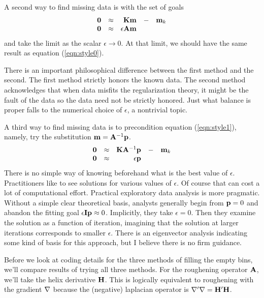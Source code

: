 \par
A second way to find missing data is with the set of goals
\begin{equation}
\begin{array}{rrrrr}
\bold 0 & \approx &          \bold K \bold m  & - & \bold m_k \\
\bold 0 & \approx & \epsilon \bold A \bold m  &   &
\end{array}
\label{eqn:style1}
\end{equation}
and take the limit as the scalar $\epsilon \rightarrow 0$.
At that limit, we should have the same result
as equation (\ref{eqn:style0}).

\par
There is an important philosophical difference between
the first method and the second.
The first method strictly honors the known data.
The second method acknowledges that when data misfits
the regularization theory, it might be the fault of the data
so the data need not be strictly honored.
Just what balance is proper falls to the numerical choice of $\epsilon$,
a nontrivial topic.

\par
A third way to find missing data is to precondition
equation (\ref{eqn:style1}),
namely, try the substitution 
$\bold m = \bold A^{-1} \bold p $.
\begin{equation}
\begin{array}{rrrrr}
\bold 0 & \approx & \bold K \bold A^{-1} \bold p  &-& \bold m_k \\
\bold 0 & \approx & \epsilon             \bold p  & &
\end{array}
\label{eqn:style2}
\end{equation}
There is no simple way of knowing beforehand
what is the best value of $\epsilon$.
Practitioners like to see solutions for various values of $\epsilon$.
Of course that can cost a lot of computational effort.
Practical exploratory data analysis is more pragmatic.
Without a simple clear theoretical basis,
analysts generally begin from $\bold p=0$
and abandon the fitting goal $\epsilon \bold I \bold p\approx 0$.
Implicitly, they take $\epsilon=0$.
Then they examine the solution as a function of iteration,
imagining that the solution at larger iterations
corresponds to smaller $\epsilon$.
There is an eigenvector analysis
indicating some kind of basis for this approach,
but I believe there is no firm guidance.

\par
Before we look at coding details for the three methods
of filling the empty bins,
we'll compare results of trying all three methods.
For the roughening operator $\bold A$,
we'll take the helix derivative $\bold H$.
This is logically equivalent to roughening with the gradient $\bold \nabla$
because the (negative) laplacian operator is
$\bold\nabla'\bold\nabla = \bold H'\bold H $.

